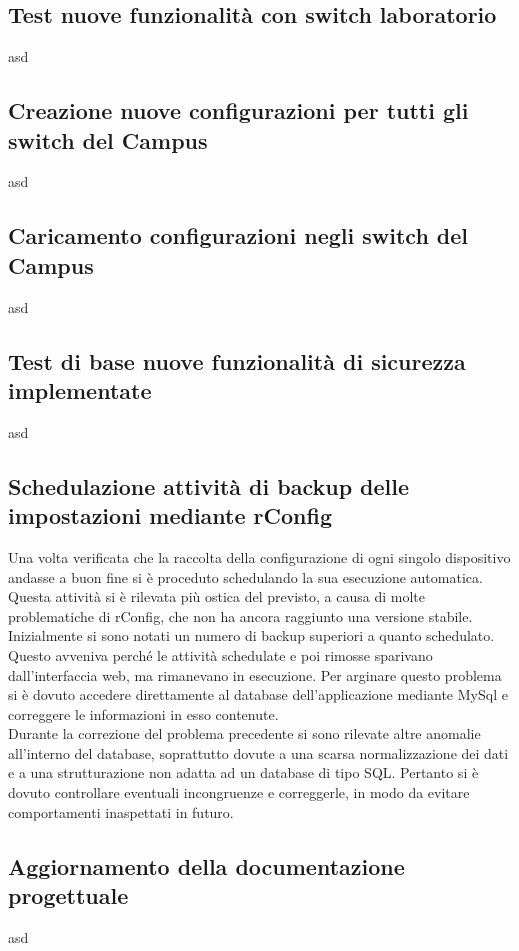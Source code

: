 \documentclass[Realizzazione.tex]{subfiles}
\begin{document}
\subsection{Test nuove funzionalità con switch laboratorio} 
asd
\subsection{Creazione nuove configurazioni per tutti gli switch del Campus} 
asd
\subsection{Caricamento configurazioni negli switch del Campus} 
asd
\subsection{Test di base nuove funzionalità di sicurezza implementate} 
asd

\subsection{Schedulazione attività di backup delle impostazioni mediante rConfig}
Una volta verificata che la raccolta della configurazione di ogni singolo dispositivo andasse a buon fine si è proceduto schedulando la sua esecuzione automatica. \\
Questa attività si è rilevata più ostica del previsto, a causa di molte problematiche di rConfig, che non ha ancora raggiunto una versione stabile. \\
Inizialmente si sono notati un numero di backup superiori a quanto schedulato. Questo avveniva perché le attività schedulate e poi rimosse sparivano dall'interfaccia web, ma rimanevano in esecuzione. Per arginare questo problema si è dovuto accedere direttamente al database dell'applicazione mediante MySql e correggere le informazioni in esso contenute. \\
Durante la correzione del problema precedente si sono rilevate altre anomalie all'interno del database, soprattutto dovute a una scarsa normalizzazione dei dati e a una strutturazione non adatta ad un database di tipo SQL. Pertanto si è dovuto controllare eventuali incongruenze e correggerle, in modo da evitare comportamenti inaspettati in futuro.

\subsection{Aggiornamento della documentazione progettuale}
asd

	
\end{document}
